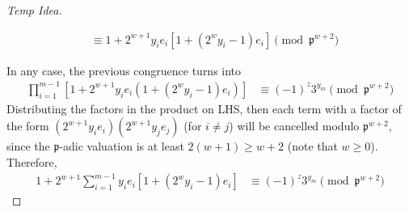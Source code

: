 \documentclass{treatise}
\begin{document}
\begin{shaded}
\begin{proof}[Temp Idea]
\begin{enumerate}
\begin{align*}
	& \equiv 1 + 2^{w + 1} y_i e_i \left[ 1 + (2^w y_i - 1) e_i \right] \pmod{\mathfrak{p}^{w + 2}}
	\end{align*}
\end{enumerate}
In any case, the previous congruence turns into
\begin{align*}
\prod_{i = 1}^{m - 1} \left[ 1 + 2^{w + 1} y_i e_i \left( 1 + (2^w y_i - 1) e_i \right) \right] & \equiv (-1)^z 3^{y_m} \pmod{\mathfrak{p}^{w + 2}}
\end{align*}
Distributing the factors in the product on LHS, then each term with a factor of the form $(2^{w + 1} y_i e_i) (2^{w + 1} y_j e_j)$ (for $i \neq j$) will be cancelled modulo $\mathfrak{p}^{w + 2}$, since the $\mathfrak{p}$-adic valuation is at least $2(w + 1) \geq w + 2$ (note that $w \geq 0$). Therefore,
\begin{align*}
1 + 2^{w + 1} \sum_{i = 1}^{m - 1} y_i e_i \left[ 1 + (2^w y_i - 1) e_i \right] & \equiv (-1)^z 3^{y_m} \pmod{\mathfrak{p}^{w + 2}}
\end{align*}
\end{proof}
\end{shaded}

\newpage
\end{document}
